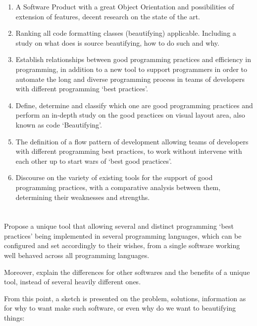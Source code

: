 \begin{enumerate}
    \item
        A Software Product with a great Object Orientation and possibilities of extension of features,
        decent research on the state of the art.
    \item
        Ranking all code formatting classes (beautifying) applicable.
        Including a study on what does is source beautifying,
        how to do such and why.
    \item
        Establish relationships between good programming practices and efficiency in programming,
        in addition to a new tool to support programmers in order to automate the long and diverse
        programming process in teams of developers with different programming `best practices'.
    \item
        Define, determine and classify which one are good programming practices and
        perform an in\hyp{}depth study on the good practices on visual layout area,
        also known as code `Beautifying'.
    \item
        The definition of a flow pattern of development allowing teams of
        developers with different programming best practices,
        to work without intervene with each other up to start wars of `best good practices'.
    \item
        Discourse on the variety of existing tools for the support of good programming practices,
        with a comparative analysis between them,
        determining their weaknesses and strengths.
\end{enumerate}



\section{}

    Propose a unique tool that allowing several and distinct
    programming `best practices' being implemented in several programming
    languages, which can be configured and set accordingly to their wishes,
    from a single software working well behaved across all programming languages.

    Moreover, explain the differences for other softwares and the benefits
    of a unique tool, instead of several heavily different ones.

    From this point, a sketch is presented on the problem, solutions,
    information as for why to want make such software, or even why do we want to
    beautifying things:

